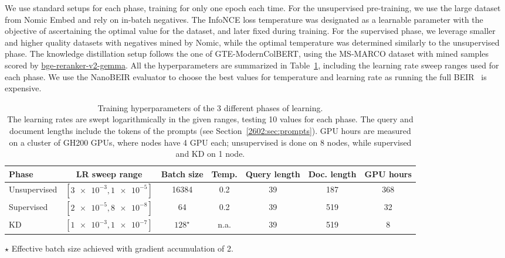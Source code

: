 We use standard setups for each phase, training for only one epoch each time.
For the unsupervised pre-training, we use the large dataset from Nomic Embed and rely on in-batch negatives. The InfoNCE loss temperature was designated as a learnable parameter with the objective of ascertaining the optimal value for the dataset, and later fixed during training. 
For the supervised phase, we leverage smaller and higher quality datasets with negatives mined by Nomic, while the optimal temperature was determined similarly to the unsupervised phase.
The knowledge distillation setup follows the one of GTE-ModernColBERT, using the MS-MARCO dataset with mined samples scored by \href{https://huggingface.co/BAAI/bge-reranker-v2-gemma}{bge-reranker-v2-gemma}. All the hyperparameters are summarized in Table~\ref{2602:tab:hyperparams}, including the learning rate sweep ranges used for each phase. We use the NanoBEIR evaluator to choose the best values for temperature and learning rate as running the full BEIR~\cite{thakur2021beir} is expensive.
\begin{table}
\centering
\caption{
  Training hyperparameters of the 3 different phases of learning. \\ 
  The learning rates are swept logarithmically in the given ranges, testing 10 values for each phase.
  The query and document lengths include the tokens of the prompts (see Section~\ref{2602:sec:prompts}).
  GPU hours are measured on a cluster of GH200 GPUs, where nodes have 4 GPU each; unsupervised is done on 8 nodes, while supervised and KD on 1 node.
}
\label{2602:tab:hyperparams}
\begin{tabular}{l c c c c c c}
\toprule
\textbf{Phase} & \textbf{LR sweep range} & \textbf{Batch size} & \textbf{Temp.} & \textbf{Query length} & \textbf{Doc. length} & \textbf{GPU hours}\\
\midrule
Unsupervised  & \([\num{3e-3}, \num{1e-5}]\) & 16384 & 0.2 & 39 & 187 & 368\\
Supervised    & \([\num{2e-5}, \num{8e-8}]\) & 64 & 0.2 & 39 & 519 & 32\\
KD            & \([\num{1e-3},  \num{1e-7}]\) & \(128^\star\) & n.a. & 39 & 519 & 8\\
\bottomrule
\end{tabular}


{\small \(\star\) Effective batch size achieved with gradient accumulation of 2.}
\end{table}



